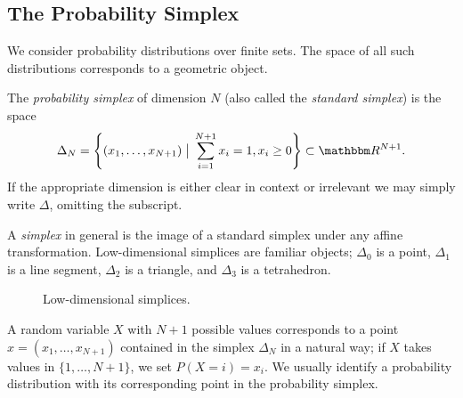 \documentclass[11pt,titlepage]{article}
\newcommand*{\vbar}{\;\big\vert\;}
\numberwithin{equation}{section}
\begin{document}
    \subsection{The Probability Simplex}

    We consider probability distributions over finite sets.  The space of all
    such distributions corresponds to a geometric object.
    
    \begin{definition} The \emph{probability simplex} of dimension $N$ (also
    called the \emph{standard simplex}) is the space
    \[
        \Delta_N = 
        \left\{(x_1, \ldots, x_{N+1}) \vbar \sum_{i=1}^{N+1} x_i= 1, x_i \ge 0 \right\} 
        \subset
        \R^{N+1}.
    \]
    If the appropriate dimension is either clear in context or irrelevant we
    may simply write $\Delta$, omitting the subscript.
    \end{definition}
    A \emph{simplex} in general is the image of a standard simplex under any
    affine transformation.  Low-dimensional simplices are familiar objects;
    $\Delta_0$ is a point, $\Delta_1$ is a line segment, $\Delta_2$ is a
    triangle, and $\Delta_3$ is a tetrahedron.
    \begin{figure}[H]
        \centering
        \caption{Low-dimensional simplices.}
    \end{figure}
    \noindent A random variable $X$ with $N+1$ possible values corresponds to a point $x =
    (x_1, \ldots, x_{N+1})$ contained in the simplex $\Delta_N$ in a natural
    way; if $X$ takes values in $\{1, \ldots, N+1\}$, we set $P(X = i) = x_i$.
    We usually identify a probability distribution with its corresponding
    point in the probability simplex.  
    
\end{document}
